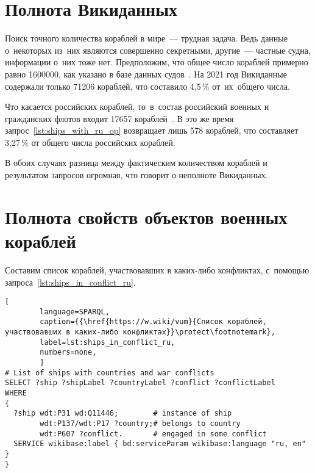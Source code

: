 \newpage
\section{Полнота Викиданных}

Поиск точного количества кораблей в мире~--- трудная задача. 
Ведь данные о~некоторых из~них являются совершенно секретными, 
другие~--- частные судна, информации о~них тоже нет. 
Предположим, что общее число кораблей примерно равно \num{1600000}, 
как указано в базе данных судов~\autocite{FleetMon}. 
На 2021 год Викиданные содержали только 71206 кораблей, 
что составило 4,5\,\% от~их~общего числа.


Что касается российских кораблей, 
то~в~состав российский военных и гражданских флотов входит \num{17657} кораблей~\autocite{RussianShips}. 
В это же время запрос~\ref{lst:ships_with_ru_op} возвращает лишь 578 кораблей, 
что составляет 3,27\,\% от общего числа российских кораблей. 

В обоих случаях разница между фактическим количеством кораблей и результатом запросов огромная, что говорит о неполноте Викиданных.






\section{Полнота свойств объектов военных кораблей}

Составим список кораблей, участвовавших в каких-либо конфликтах, 
с~помощью запроса~\ref{lst:ships_in_conflict_ru}.

\begin{lstlisting}[ 
        language=SPARQL, 
        caption={{\href{https://w.wiki/vum}{Список кораблей, участвовавших в каких-либо конфликтах}}\protect\footnotemark}, 
        label=lst:ships_in_conflict_ru, 
        numbers=none,
        ]
# List of ships with countries and war conflicts
SELECT ?ship ?shipLabel ?countryLabel ?conflict ?conflictLabel
WHERE
{
  ?ship wdt:P31 wd:Q11446;        # instance of ship
        wdt:P137/wdt:P17 ?country;# belongs to country
        wdt:P607 ?conflict.       # engaged in some conflict
  SERVICE wikibase:label { bd:serviceParam wikibase:language "ru, en" }
}
\end{lstlisting}



